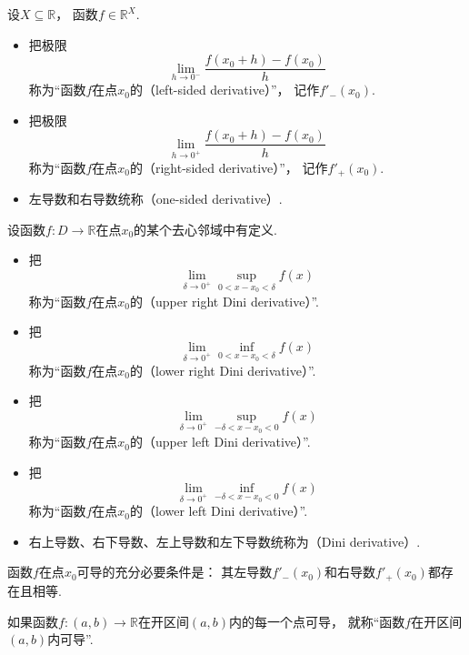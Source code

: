 \begin{definition}
设\(X\subseteq\mathbb{R}\)，
函数\(f\in\mathbb{R}^X\).
\begin{itemize}
	\item 把极限\[
		\lim_{h\to0^-} \frac{f(x_0+h)-f(x_0)}{h}
	\]称为“函数\(f\)在点\(x_0\)的（left-sided derivative）”，
	记作\(f'_-(x_0)\).
	\item 把极限\[
		\lim_{h\to0^+} \frac{f(x_0+h)-f(x_0)}{h}
	\]称为“函数\(f\)在点\(x_0\)的（right-sided derivative）”，
	记作\(f'_+(x_0)\).
	\item 左导数和右导数统称（one-sided derivative）.
\end{itemize}
\end{definition}

\begin{definition}
设函数\(f\colon D\to\mathbb{R}\)在点\(x_0\)的某个去心邻域中有定义.
\begin{itemize}
	\item 把\[
		\lim_{\delta\to0^+} \sup_{0<x-x_0<\delta} f(x)
	\]称为“函数\(f\)在点\(x_0\)的（upper right Dini derivative）”.
	\item 把\[
		\lim_{\delta\to0^+} \inf_{0<x-x_0<\delta} f(x)
	\]称为“函数\(f\)在点\(x_0\)的（lower right Dini derivative）”.
	\item 把\[
		\lim_{\delta\to0^+} \sup_{-\delta<x-x_0<0} f(x)
	\]称为“函数\(f\)在点\(x_0\)的（upper left Dini derivative）”.
	\item 把\[
		\lim_{\delta\to0^+} \inf_{-\delta<x-x_0<0} f(x)
	\]称为“函数\(f\)在点\(x_0\)的（lower left Dini derivative）”.
	\item 右上导数、右下导数、左上导数和左下导数统称为（Dini derivative）.
\end{itemize}
\end{definition}

\begin{theorem}[导数存在的充分必要条件]
函数\(f\)在点\(x_0\)可导的充分必要条件是：
其左导数\(f'_-(x_0)\)和右导数\(f'_+(x_0)\)都存在且相等.
\end{theorem}

\begin{definition}
如果函数\(f\colon(a,b)\to\mathbb{R}\)在开区间\((a,b)\)内的每一个点可导，
就称“函数\(f\)在开区间\((a,b)\)内可导”.
\end{definition}

